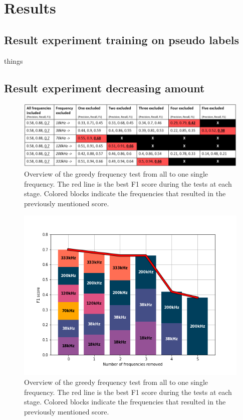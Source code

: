 \clearpage
\chapter{Results}
\section{Result experiment training on pseudo labels}
    things
\section{Result experiment decreasing amount}
    \clearpage
    \begin{figure}[H]
        \centering
        \includegraphics[scale=0.6]{figures/results_decreasing_table.png}
        \caption{Overview of the greedy frequency test from all to one single frequency. The red line is the best F1 score during the tests at each stage. Colored blocks indicate the frequencies that resulted in the previously mentioned score.}
      	\medskip 
        \label{results_decreasing_table}
    \end{figure}
    \clearpage
    \begin{figure}[H]
        \centering
        \includegraphics[scale=0.8]{figures/ta_vekk_frekvenser.png}
        \caption{Overview of the greedy frequency test from all to one single frequency. The red line is the best F1 score during the tests at each stage. Colored blocks indicate the frequencies that resulted in the previously mentioned score.}
      	\medskip 
        \label{decrease_amount_fig}
    \end{figure}

